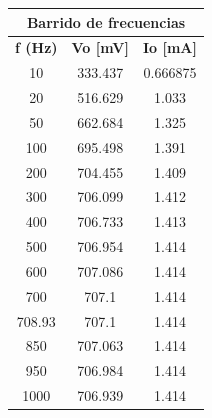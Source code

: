 \documentclass[conference]{IEEEtran}
\begin{document}
	\begin{table}[h]
		\centering
		\begin{tabular}{|ccc|}
			\hline
			\multicolumn{3}{|c|}{\textbf{Barrido   de frecuencias}}                                                  \\ \hline
			\multicolumn{1}{|c|}{\textbf{f (Hz)}} & \multicolumn{1}{c|}{\textbf{Vo {[}mV{]}}} & \textbf{Io {[}mA{]}} \\ \hline
			\multicolumn{1}{|c|}{10}              & \multicolumn{1}{c|}{333.437}              & 0.666875             \\ \hline
			\multicolumn{1}{|c|}{20}              & \multicolumn{1}{c|}{516.629}              & 1.033                \\ \hline
			\multicolumn{1}{|c|}{50}              & \multicolumn{1}{c|}{662.684}              & 1.325                \\ \hline
			\multicolumn{1}{|c|}{100}             & \multicolumn{1}{c|}{695.498}              & 1.391                \\ \hline
			\multicolumn{1}{|c|}{200}             & \multicolumn{1}{c|}{704.455}              & 1.409                \\ \hline
			\multicolumn{1}{|c|}{300}             & \multicolumn{1}{c|}{706.099}              & 1.412                \\ \hline
			\multicolumn{1}{|c|}{400}             & \multicolumn{1}{c|}{706.733}              & 1.413                \\ \hline
			\multicolumn{1}{|c|}{500}             & \multicolumn{1}{c|}{706.954}              & 1.414                \\ \hline
			\multicolumn{1}{|c|}{600}             & \multicolumn{1}{c|}{707.086}              & 1.414                \\ \hline
			\multicolumn{1}{|c|}{700}             & \multicolumn{1}{c|}{707.1}                & 1.414                \\ \hline
			\multicolumn{1}{|c|}{708.93}          & \multicolumn{1}{c|}{707.1}                & 1.414                \\ \hline
			\multicolumn{1}{|c|}{850}             & \multicolumn{1}{c|}{707.063}              & 1.414                \\ \hline
			\multicolumn{1}{|c|}{950}             & \multicolumn{1}{c|}{706.984}              & 1.414                \\ \hline
			\multicolumn{1}{|c|}{1000}            & \multicolumn{1}{c|}{706.939}              & 1.414                \\ \hline

\end{tabular}
\end{table}
\end{document}
